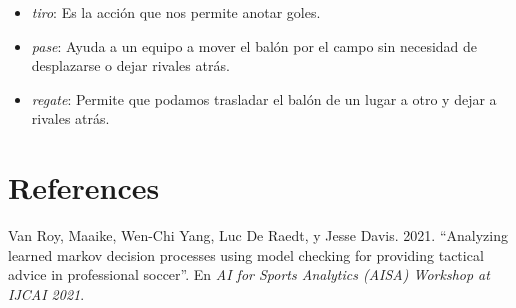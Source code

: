 \documentclass[
  us-letterpaper,
  DIV=11,
  numbers=noendperiod]{scrreprt}
\providecommand{\tightlist}{%
  \setlength{\itemsep}{0pt}\setlength{\parskip}{0pt}}\usepackage{longtable,booktabs,array}
\newlength{\cslhangindent}
\newenvironment{CSLReferences}[2] %
 {\begin{list}{}{%
  \setlength{\itemindent}{0pt}
  \setlength{\leftmargin}{0pt}
  \setlength{\parsep}{0pt}
  \ifodd #1
   \setlength{\leftmargin}{\cslhangindent}
   \setlength{\itemindent}{-1\cslhangindent}
  \fi
  \setlength{\itemsep}{#2\baselineskip}}}
 {\end{list}}
\begin{document}
\begin{itemize}
\tightlist
\item
  \emph{tiro}: Es la acción que nos permite anotar goles.
\item
  \emph{pase}: Ayuda a un equipo a mover el balón por el campo sin
  necesidad de desplazarse o dejar rivales atrás.
\item
  \emph{regate}: Permite que podamos trasladar el balón de un lugar a
  otro y dejar a rivales atrás.
\end{itemize}


\chapter*{References}\label{references}


\label{refs}
\begin{CSLReferences}{1}{0}
Van Roy, Maaike, Wen-Chi Yang, Luc De Raedt, y Jesse Davis. 2021.
{``Analyzing learned markov decision processes using model checking for
providing tactical advice in professional soccer''}. En \emph{AI for
Sports Analytics (AISA) Workshop at IJCAI 2021}.

\end{CSLReferences}
\end{document}
